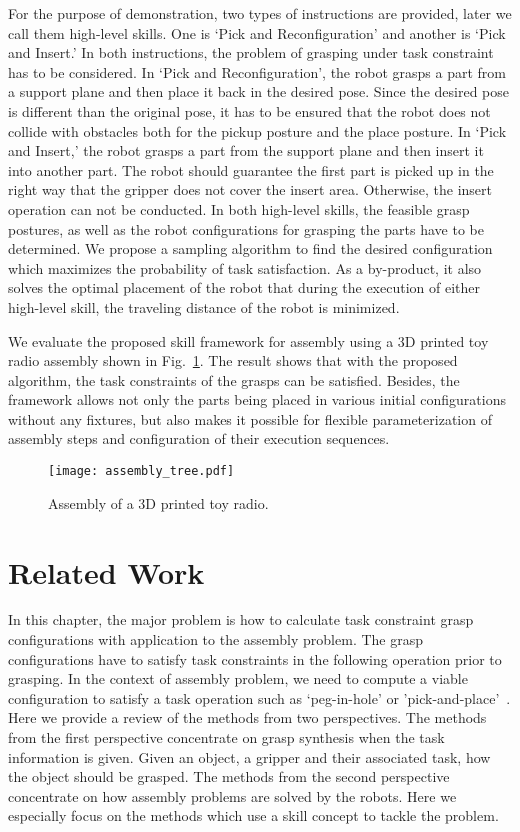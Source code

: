 For the purpose of demonstration, two types of instructions are provided, later we call them high-level skills.  One is `Pick and Reconfiguration' and another is `Pick and Insert.' In both instructions, the problem of grasping under task constraint has to be considered. In `Pick and Reconfiguration', the robot grasps a part from a support plane and then place it back in the desired pose. Since the desired pose is different than the original pose, it has to be ensured that the robot does not collide with obstacles both for the pickup posture and the place posture. In `Pick and Insert,' the robot grasps a part from the support plane and then insert it into another part. The robot should guarantee the first part is picked up in the right way that the gripper does not cover the insert area. Otherwise, the insert operation can not be conducted. In both high-level skills, the feasible grasp postures, as well as the robot configurations for grasping the parts have to be determined. We propose a sampling algorithm to find the desired configuration which maximizes the probability of task satisfaction. As a by-product, it also solves the optimal placement of the robot that during the execution of either high-level skill, the traveling distance of the robot is minimized. 

We evaluate the proposed skill framework for assembly using a 3D printed toy radio assembly shown in Fig.~\ref{fig:assembly_tree}. The result shows that with the proposed algorithm, the task constraints of the grasps can be satisfied. Besides, the framework allows not only the parts being placed in various initial configurations without any fixtures, but also makes it possible for flexible parameterization of assembly steps and configuration of their execution sequences. 
\begin{figure}[!htbp]
\centering
\texttt{[image: assembly\_tree.pdf]}
\captionsetup{justification=raggedright}
\caption{Assembly of a 3D printed toy radio.}
\label{fig:assembly_tree}
\end{figure} 

\section{Related Work}
In this chapter, the major problem is how to calculate task constraint grasp configurations with application to the assembly problem. The grasp configurations have to satisfy task constraints in the following operation prior to grasping. In the context of assembly problem, we need to compute a viable configuration  to satisfy a task operation such as `peg-in-hole' or 'pick-and-place'~\cite{Holz2015}. Here we provide a review of the methods from two perspectives. The methods from the first perspective    concentrate on grasp synthesis when the task information is given. Given an object, a gripper and their associated task, how the object should be grasped. The methods from the second perspective concentrate on how assembly problems are solved by the robots. Here we especially focus on the methods which use a skill concept to tackle the problem. 

